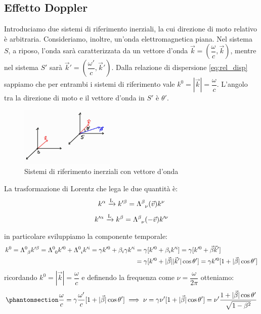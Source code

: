 \subsection{Effetto Doppler}
Introduciamo due sistemi di riferimento inerziali, la cui direzione di moto relativo è arbitraria. Consideriamo, inoltre, un'onda elettromagnetica piana. Nel sistema $S$, a riposo, l'onda sarà caratterizzata da un vettore d'onda $\Vec{k}=(\dfrac{\omega}{c},\Vec{k})$, mentre nel sistema $S'$ sarà $\Vec{k}'=(\dfrac{\omega'}{c},\Vec{k}')$. Dalla relazione di dispersione \eqref{eq:rel_disp} sappiamo che per entrambi i sistemi di riferimento vale $k^0=|\Vec{k}|=\dfrac{\omega}{c}$. L'angolo tra la direzione di moto e il vettore d'onda in $S'$ è $\theta'$.
\begin{figure}[h]
    \centering
    \includegraphics[width=0.40\textwidth]{Immagini/Doppler.jpg}
    \caption{ Sistemi di riferimento inerziali con vettore d'onda}
    \label{fig:Doppler}
\end{figure}

La trasformazione di Lorentz che lega le due quantità è:
\begin{equation}
\begin{gathered}
      k^{\alpha}\xrightarrow[\text{}]{\text{L}}k'^{\beta}=\Lambda\indices{^\beta_\nu}(\Vec{v}) k^{\nu}\\
         k'^{\alpha}\xrightarrow[\text{}]{\text{L}}k^{\beta}=\Lambda\indices{^\beta_\nu}(-\Vec{v}) k'^{\nu}
\end{gathered}
\end{equation}
in particolare sviluppiamo la componente temporale:
\begin{equation}
   \begin{split}
       k^0=\Lambda\indices{^0_\beta} k'^{\beta}=\Lambda\indices{^0_0} k'^{0}+\Lambda\indices{^0_i} k'^{i}=\gamma k'^{0}+\beta_i\gamma k'^{i}&=\gamma[ k'^{0}+\beta_i k'^{i}]=\gamma[ k'^{0}+\Vec{\beta}\Vec{k}']\\
       &=\gamma[ k'^{0}+|\Vec{\beta}||\Vec{k}'|\cos{\theta'}]=\gamma k'^{0}[ 1+|\Vec{\beta}|\cos{\theta'}]
   \end{split}
\end{equation}
ricordando $k^0=|\Vec{k}|=\dfrac{\omega}{c}$ e definendo la frequenza come $\nu=\dfrac{\omega}{2\pi}$ otteniamo:
\begin{equation}\phantomsection\label{eq:Doppler_fre}
       \dfrac{\omega}{c}=\gamma\dfrac{\omega'}{c}[ 1+|\Vec{\beta}|\cos{\theta'}] \implies  \nu=\gamma\nu'[ 1+|\Vec{\beta}|\cos{\theta'}]=\nu'\dfrac{1+|\Vec{\beta}|\cos{\theta'}}{\sqrt{1-\beta^2}}
\end{equation}

